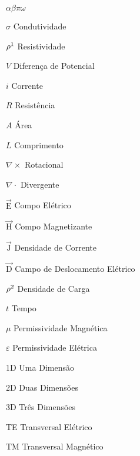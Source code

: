 \documentclass[csgeo,tcc]{unipampa}
\newcommand{\ven}[1]{\vec{\textrm{#1}}}                                         %
\begin{document}

\begin{listofsymbols}{$\alpha\beta\pi\omega$}
       \item[$\sigma$]                  Condutividade
       \item[$\rho\footnote{Demonstrado na decução de resistividade dos materiais}$]                  Resistividade
       \item[$V$]                       Diferença de Potencial
       \item[$i$]                       Corrente
       \item[$R$]                       Resistência
       \item[$A$]                       Área
       \item[$L$]                       Comprimento
       \item[$\nabla \times$]           Rotacional
       \item[$\nabla \cdot$]            Divergente
       \item[$\ven{E}$]                 Compo Elétrico
       \item[$\ven{H}$]                 Compo Magnetizante
       \item[$\ven{J}$]                 Densidade de Corrente
       \item[$\ven{D}$]                 Campo de Deslocamento Elétrico
       \item[$\rho\footnote{Demonstrado na decução de campos eletromagnéticos}$]                      Densidade de Carga
       \item[$t$]                       Tempo
       \item[$\mu$]                     Permissividade Magnética
       \item[$\varepsilon$]             Permissividade Elétrica
       \item[1D]                        Uma Dimensão
       \item[2D]                        Duas Dimensões
       \item[3D]                        Três Dimensões
       \item[TE]                        Transversal Elétrico
       \item[TM]                        Transversal Magnético
       
\end{listofsymbols}
\end{document}
